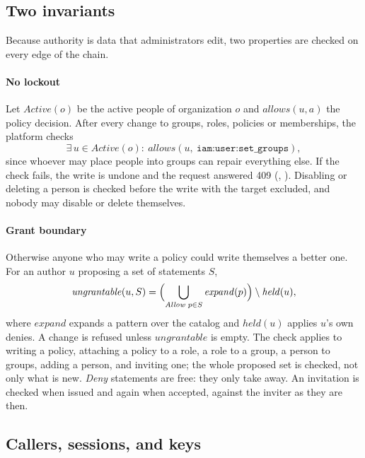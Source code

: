 \subsection{Two invariants}

Because authority is data that administrators edit, two properties are
checked on every edge of the chain.

\paragraph{No lockout}
Let $\mathit{Active}(o)$ be the active people of organization $o$ and
$\mathit{allows}(u,a)$ the policy decision. After every change to
groups, roles, policies or memberships, the platform checks
\[
\exists\, u \in \mathit{Active}(o) :\ \mathit{allows}(u,\ \texttt{iam:user:set\_groups}),
\]
since whoever may place people into groups can repair everything else.
If the check fails, the write is undone and the request answered 409
(,
). Disabling or deleting a person
is checked before the write with the target excluded, and nobody may
disable or delete themselves.

\paragraph{Grant boundary}
Otherwise anyone who may write a policy could write themselves a
better one. For an author $u$ proposing a set of statements $S$,
\[
\mathit{ungrantable}(u,S) = \Bigl(\bigcup_{\textit{Allow } p \in S}\mathit{expand}(p)\Bigr) \setminus \mathit{held}(u),
\]
where $\mathit{expand}$ expands a pattern over the catalog and
$\mathit{held}(u)$ applies $u$'s own denies. A change is refused unless
$\mathit{ungrantable}$ is empty. The check applies to writing a policy,
attaching a policy to a role, a role to a group, a person to groups,
adding a person, and inviting one; the whole proposed set is checked,
not only what is new. \emph{Deny} statements are free: they only take
away. An invitation is checked when issued and again when accepted,
against the inviter as they are then.

\subsection{Callers, sessions, and keys}

